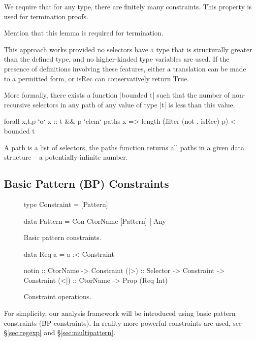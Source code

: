 \documentclass[preprint]{sigplanconf}
\newcommand{\C}[1]{\textsf{#1}}
\newenvironment{discuss}
    {\noindent\hspace{-1.5mm}\vline\hspace{1mm}\vline\hspace{1mm}\begin{minipage}[h]{\linewidth}}
    {\end{minipage}}
\begin{document}
\begin{discuss}
We require that for any type, there are finitely many constraints. This property is used for termination proofs.

Mention that this lemma is required for termination.

This approach works provided no selectors have a type that is structurally greater than the defined type, and no higher-kinded type variables are used. If the presence of definitions involving these features, either a translation can be made to a permitted form, or \C{isRec} can conservatively return True.

More formally, there exists a function |bounded t| such that the number of non-recursive selectors in any path of any value of type |t| is less than this value.

\begin{code}
forall x,t,p `o`  x :: t && p `elem` paths x =>
                  length (filter (not . isRec) p) < bounded t
\end{code}

A path is a list of selectors, the \C{paths} function returns all paths in a given data structure -- a potentially infinite number.
\end{discuss}


\subsection{Basic Pattern (BP) Constraints}
\label{sec:basic}

\begin{figure}
\begin{code}
type Constraint = [Pattern]

data Pattern  =  Con CtorName [Pattern]
              |  Any
\end{code}
\caption{Basic pattern constraints.}
\label{fig:basic}
\end{figure}

\begin{figure}
\begin{code}
data Req a = a :< Constraint

notin :: CtorName -> Constraint
(|>) :: Selector -> Constraint -> Constraint
(<|) :: CtorName -> Prop (Req Int)
\end{code}
\caption{Constraint operations.}
\label{fig:constraint}
\end{figure}

For simplicity, our analysis framework will be introduced using basic pattern constraints (BP-constraints). In  reality more powerful constraints are used, see \S\ref{sec:regexp} and \S\ref{sec:multipattern}.
\end{document}
